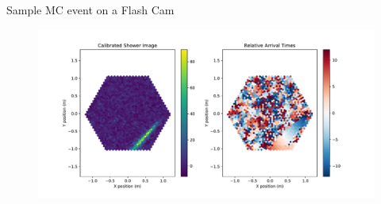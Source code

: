 \begin{frame}{Sample MC event on a Flash Cam}
    \begin{figure}
        \includegraphics[width=\linewidth]{images/cleaning_plots/raw.pdf}
    \end{figure}
\end{frame}






